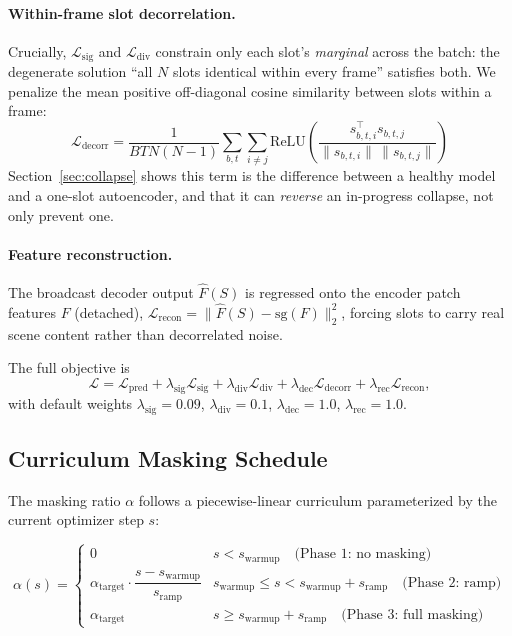 \documentclass[12pt]{article}
\begin{document}
\paragraph{Within-frame slot decorrelation.} Crucially, $\mathcal{L}_{\text{sig}}$ and $\mathcal{L}_{\text{div}}$ constrain only each slot's \emph{marginal} across the batch: the degenerate solution ``all $N$ slots identical within every frame'' satisfies both. We penalize the mean positive off-diagonal cosine similarity between slots within a frame:
\begin{equation}
\mathcal{L}_{\text{decorr}} = \frac{1}{BTN(N-1)}\sum_{b,t}\sum_{i \neq j} \text{ReLU}\!\left( \frac{s_{b,t,i}^\top s_{b,t,j}}{\|s_{b,t,i}\| \, \|s_{b,t,j}\|} \right)
\end{equation}
Section~\ref{sec:collapse} shows this term is the difference between a healthy model and a one-slot autoencoder, and that it can \emph{reverse} an in-progress collapse, not only prevent one.

\paragraph{Feature reconstruction.} The broadcast decoder output $\hat{F}(S)$ is regressed onto the encoder patch features $F$ (detached), $\mathcal{L}_{\text{recon}} = \|\hat{F}(S) - \text{sg}(F)\|_2^2$, forcing slots to carry real scene content rather than decorrelated noise.

The full objective is
\begin{equation}
\mathcal{L} = \mathcal{L}_{\text{pred}} + \lambda_{\text{sig}}\mathcal{L}_{\text{sig}} + \lambda_{\text{div}}\mathcal{L}_{\text{div}} + \lambda_{\text{dec}}\mathcal{L}_{\text{decorr}} + \lambda_{\text{rec}}\mathcal{L}_{\text{recon}},
\end{equation}
with default weights $\lambda_{\text{sig}} = 0.09$, $\lambda_{\text{div}} = 0.1$, $\lambda_{\text{dec}} = 1.0$, $\lambda_{\text{rec}} = 1.0$.

\subsection{Curriculum Masking Schedule}

The masking ratio $\alpha$ follows a piecewise-linear curriculum parameterized by the current optimizer step $s$:

\begin{equation}
\alpha(s) = \begin{cases}
0 & s < s_{\text{warmup}} \quad \text{(Phase 1: no masking)}\\[3pt]
\alpha_{\text{target}} \cdot \dfrac{s - s_{\text{warmup}}}{s_{\text{ramp}}} & s_{\text{warmup}} \leq s < s_{\text{warmup}} + s_{\text{ramp}} \quad \text{(Phase 2: ramp)}\\[6pt]
\alpha_{\text{target}} & s \geq s_{\text{warmup}} + s_{\text{ramp}} \quad \text{(Phase 3: full masking)}
\end{cases}
\end{equation}
\end{document}

